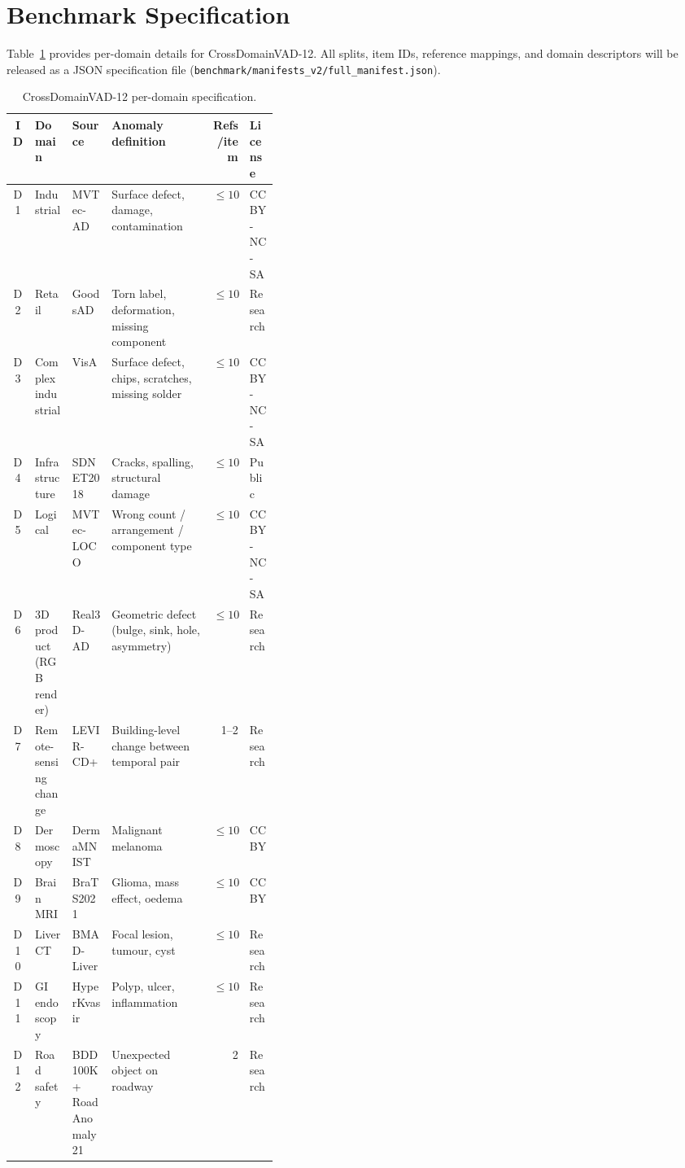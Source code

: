 \section{Benchmark Specification}
\label{app:benchmark}

Table~\ref{tab:benchmark_detail} provides per-domain details for CrossDomainVAD-12. All splits, item IDs, reference mappings, and domain descriptors will be released as a JSON specification file (\texttt{benchmark/manifests\_v2/full\_manifest.json}).

\begin{table}[t]
\centering
\caption{CrossDomainVAD-12 per-domain specification.}
\label{tab:benchmark_detail}
\footnotesize
\setlength{\tabcolsep}{4pt}
\begin{tabular}{cllp{0.38\linewidth}rl}
\toprule
ID & Domain & Source & Anomaly definition & Refs/item & License \\
\midrule
D1  & Industrial  & MVTec-AD & Surface defect, damage, contamination & $\le 10$ & CC BY-NC-SA \\
D2  & Retail  & GoodsAD & Torn label, deformation, missing component & $\le 10$ & Research \\
D3  & Complex industrial  & VisA & Surface defect, chips, scratches, missing solder & $\le 10$ & CC BY-NC-SA \\
D4  & Infrastructure  & SDNET2018 & Cracks, spalling, structural damage & $\le 10$ & Public \\
D5  & Logical  & MVTec-LOCO & Wrong count / arrangement / component type & $\le 10$ & CC BY-NC-SA \\
D6  & 3D product (RGB render) & Real3D-AD & Geometric defect (bulge, sink, hole, asymmetry) & $\le 10$ & Research \\
D7  & Remote-sensing change  & LEVIR-CD+ & Building-level change between temporal pair & 1--2 & Research \\
D8  & Dermoscopy  & DermaMNIST & Malignant melanoma & $\le 10$ & CC BY \\
D9  & Brain MRI  & BraTS2021 & Glioma, mass effect, oedema & $\le 10$ & CC BY \\
D10 & Liver CT  & BMAD-Liver & Focal lesion, tumour, cyst & $\le 10$ & Research \\
D11 & GI endoscopy  & HyperKvasir & Polyp, ulcer, inflammation & $\le 10$ & Research \\
D12 & Road safety  & BDD100K + RoadAnomaly21 & Unexpected object on roadway & 2 & Research \\
\bottomrule
\end{tabular}
\end{table}

